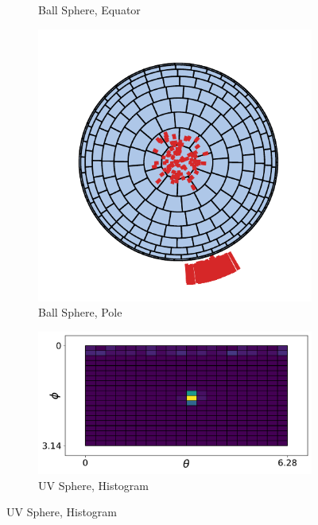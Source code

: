 \begin{figure}[H]
\begin{subfigure}[t]{.23\linewidth}
    \caption{Ball Sphere, Equator\label{fig:ch3_bg_ga_c}}
  \end{subfigure}
   \begin{subfigure}[t]{.23\linewidth}
    \centering\includegraphics[width=.95\linewidth]{chapter_3_polylidar3d/imgs/ref_ga/strips_sphere_2.pdf}
    \caption{Ball Sphere, Pole\label{fig:ch3_bg_ga_d}}
  \end{subfigure}
  \par\bigskip
    \centering
  \begin{subfigure}[t]{.49\linewidth}
    \centering\includegraphics[width=.99\linewidth]{chapter_3_polylidar3d/imgs/ref_ga/uv_histogram.pdf}
    \caption{UV Sphere, Histogram\label{fig:ch3_bg_ga_e}}\vspace{6pt}
  \end{subfigure}

\end{figure}
